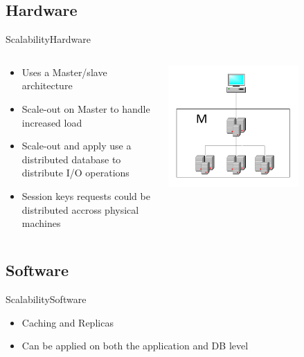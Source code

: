 \subsection{Hardware}
\begin{frame}{Scalability}{Hardware}
  \begin{columns}[T]
    \begin{column}{.5\textwidth}
     \begin{block}{}
    \begin{itemize}
  	\item Uses a Master/slave architecture
    \item Scale-out on Master to handle increased load
    \item Scale-out and apply use a distributed database to distribute I/O operations  
    \item Session keys requests could be distributed accross physical machines
    \end{itemize}
    \end{block}
    \end{column}
    \begin{column}{.5\textwidth}
    \begin{block}{}
    \begin{center}
    \includegraphics[width=0.7\textwidth]{images/master_scaling.pdf}
    \end{center}
    \end{block}
    \end{column}
\end{columns}\end{frame}



\subsection{Software}
\begin{frame}{Scalability}{Software}
  \begin{itemize}
    \item Caching and Replicas
    \item Can be applied on both the application and DB level
  \end{itemize}
\end{frame}

